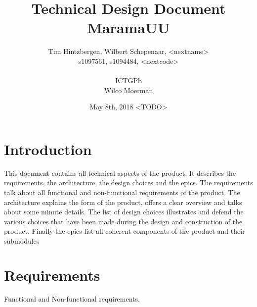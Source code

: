 \documentclass[10pt]{extarticle} %
\title{\huge Technical Design Document MaramaUU}
\author{Tim Hintzbergen, Wilbert Schepenaar, <nextname>    \\s1097561, s1094484, <nextcode>
\\\\ICTGPb
\\Wilco Moerman}
\date{May 8th, 2018 <TODO>}
\begin{document}
    \maketitle
    \thispagestyle{empty}
    \newpage
    \newpage
    \setcounter{page}{1}
    \section {Introduction}
    This document contains all technical aspects of the product.
    It describes the requirements, the architecture, the design choices and the epics.
    The requirements talk about all functional and non-functional requirements of the product.
    The architecture explains the form of the product, offers a clear overview and talks about some minute details.
    The list of design choices illustrates and defend the various choices that have been made during the design and construction of the product.
    Finally the epics list all coherent components of the product and their submodules
    \newpage

    \tableofcontents{}
    \newpage

    \section{Requirements}
    Functional and Non-functional requirements.
    \newpage

\end{document}
